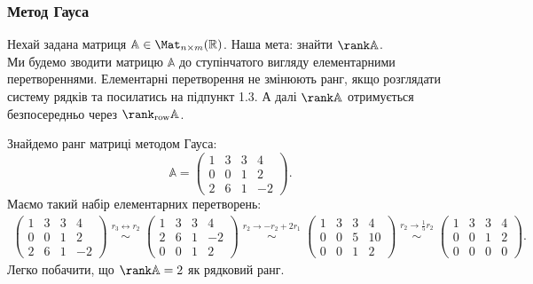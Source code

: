 \documentclass{math_library}
\begin{document}
\subsubsection*{Метод Гауса}
Нехай задана матриця $\mathbb{A} \in \Mat_{n \times m}(\mathbb{R})$. Наша мета: знайти $\rank \mathbb{A}$.\\
Ми будемо зводити матрицю $\mathbb{A}$ до ступінчатого вигляду елементарними перетвореннями. Елементарні перетворення не змінюють ранг, якщо розглядати систему рядків та посилатись на підпункт 1.3. А далі $\rank \mathbb{A}$ отримується безпосередньо через $\rank_{\textrm{row}} \mathbb{A}$.
\begin{example}
Знайдемо ранг матриці методом Гауса:
\[
\mathbb{A} = \begin{pmatrix}
1 & 3 & 3 & 4 \\
0 & 0 & 1 & 2 \\
2 & 6 & 1 & -2
\end{pmatrix}.
\]
Маємо такий набір елементарних перетворень:
\begin{align*}
\begin{pmatrix}
1 & 3 & 3 & 4 \\
0 & 0 & 1 & 2 \\
2 & 6 & 1 & -2
\end{pmatrix} \overset{\substack{r_3 \leftrightarrow r_2}}{\sim} \begin{pmatrix}
1 & 3 & 3 & 4 \\
2 & 6 & 1 & -2 \\
0 & 0 & 1 & 2
\end{pmatrix} \overset{\substack{r_2 \to -r_2 + 2r_1}}{\sim} \begin{pmatrix}
1 & 3 & 3 & 4 \\
0 & 0 & 5 & 10 \\
0 & 0 & 1 & 2
\end{pmatrix} \overset{\substack{r_2 \to \frac{1}{5}r_2}}{\sim} \begin{pmatrix}
1 & 3 & 3 & 4 \\
0 & 0 & 1 & 2 \\
0 & 0 & 0 & 0
\end{pmatrix}.
\end{align*}
Легко побачити, що $\rank \mathbb{A} = 2$ як рядковий ранг.
\end{example}
\end{document}
